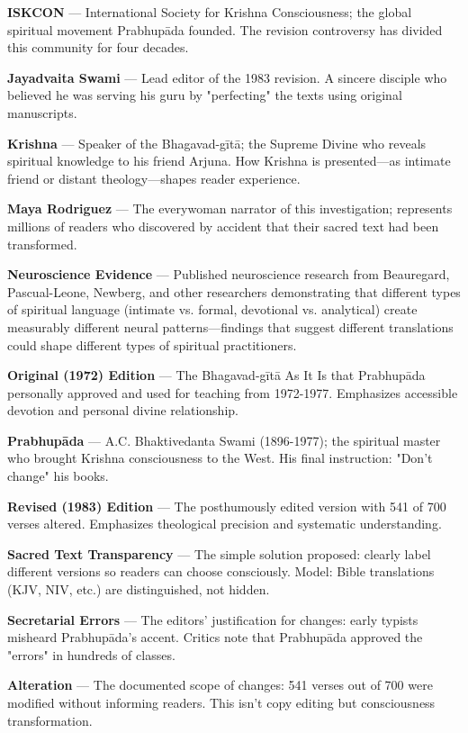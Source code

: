 \documentclass[12pt,twoside]{book}
\begin{document}
\textbf{ISKCON} — International Society for Krishna Consciousness; the global spiritual movement Prabhupāda founded. The revision controversy has divided this community for four decades.

\textbf{Jayadvaita Swami} — Lead editor of the 1983 revision. A sincere disciple who believed he was serving his guru by "perfecting" the texts using original manuscripts.

\textbf{Krishna} — Speaker of the Bhagavad-gītā; the Supreme Divine who reveals spiritual knowledge to his friend Arjuna. How Krishna is presented—as intimate friend or distant theology—shapes reader experience.

\textbf{Maya Rodriguez} — The everywoman narrator of this investigation; represents millions of readers who discovered by accident that their sacred text had been transformed.

\textbf{Neuroscience Evidence} — Published neuroscience research from Beauregard, Pascual-Leone, Newberg, and other researchers demonstrating that different types of spiritual language (intimate vs. formal, devotional vs. analytical) create measurably different neural patterns—findings that suggest different translations could shape different types of spiritual practitioners.

\textbf{Original (1972) Edition} — The Bhagavad-gītā As It Is that Prabhupāda personally approved and used for teaching from 1972-1977. Emphasizes accessible devotion and personal divine relationship.

\textbf{Prabhupāda} — A.C. Bhaktivedanta Swami (1896-1977); the spiritual master who brought Krishna consciousness to the West. His final instruction: "Don't change" his books.

\textbf{Revised (1983) Edition} — The posthumously edited version with 541 of 700 verses altered. Emphasizes theological precision and systematic understanding.

\textbf{Sacred Text Transparency} — The simple solution proposed: clearly label different versions so readers can choose consciously. Model: Bible translations (KJV, NIV, etc.) are distinguished, not hidden.

\textbf{Secretarial Errors} — The editors' justification for changes: early typists misheard Prabhupāda's accent. Critics note that Prabhupāda approved the "errors" in hundreds of classes.

\textbf{Alteration} — The documented scope of changes: 541 verses out of 700 were modified without informing readers. This isn't copy editing but consciousness transformation.
\end{document}

